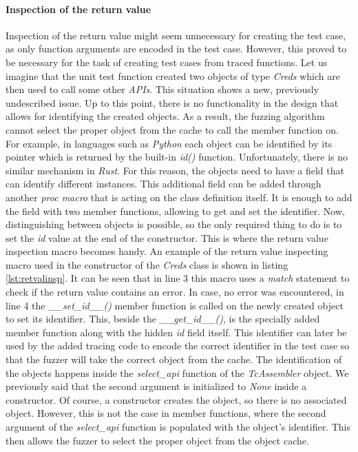 \paragraph{Inspection of the return value}
Inspection of the return value might seem unnecessary for creating the test case, as only function arguments are encoded in the test case. However, this proved to be necessary for the task of creating test cases from traced functions. Let us imagine that the unit test function created two objects of type \textit{Creds} which are then used to call some other \textit{APIs}. This situation shows a new, previously undescribed issue. Up to this point, there is no functionality in the design that allows for identifying the created objects. As a result, the fuzzing algorithm cannot select the proper object from the cache to call the member function on. For example, in languages such as \textit{Python} each object can be identified by its pointer which is returned by the built-in \textit{id()} function. Unfortunately, there is no similar mechanism in \textit{Rust}. For this reason, the objects need to have a field that can identify different instances. This additional field can be added through another \textit{proc macro} that is acting on the class definition itself. It is enough to add the field with two member functions, allowing to get and set the identifier. Now, distinguishing between objects is possible, so the only required thing to do is to set the \textit{id} value at the end of the constructor. This is where the return value inspection macro becomes handy. An example of the return value inspecting macro used in the constructor of the \textit{Creds} class is shown in listing \ref{lst:retvalinsp}. It can be seen that in line 3 this macro uses a \textit{match} statement to check if the return value contains an error. In case, no error was encountered, in line 4 the \textit{\_\_set\_id\_\_()} member function is called on the newly created object to set its identifier. This, beside the \textit{\_\_get\_id\_\_()}, is the specially added member function along with the hidden \textit{id} field itself. This identifier can later be used by the added tracing code to encode the correct identifier in the test case so that the fuzzer will take the correct object from the cache. The identification of the objects happens inside the \textit{select\_api} function of the \textit{TcAssembler} object. We previously said that the second argument is initialized to \textit{None} inside a constructor. Of course, a constructor creates the object, so there is no associated object. However, this is not the case in member functions, where the second argument of the \textit{select\_api} function is populated with the object's identifier. This then allows the fuzzer to select the proper object from the object cache.


